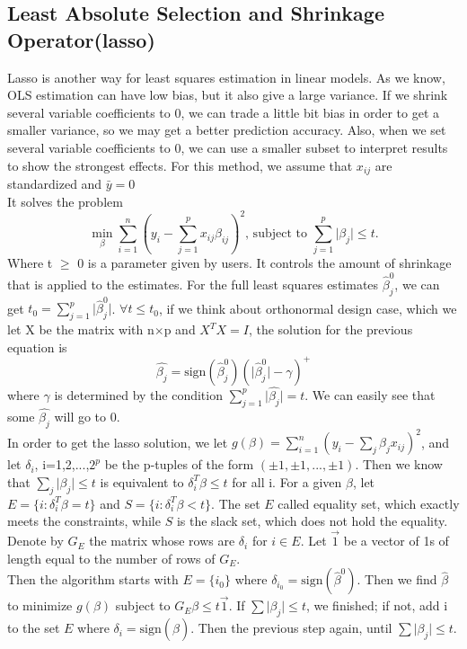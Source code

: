 \documentclass[12pt]{article}
\begin{document}
\subsection{Least Absolute Selection and Shrinkage Operator(lasso)}  
Lasso is another way for least squares estimation in linear models. As we know, OLS estimation can have low bias, but it also give a large variance. If we shrink several variable coefficients to 0, we can trade a little bit bias in order to get a smaller variance, so we may get a better prediction accuracy. Also, when we set several variable coefficients to 0, we can use a smaller subset to interpret results to show the strongest effects. For this method, we assume that $x_{ij}$ are standardized and $\bar y = 0$ \\
It solves the problem $$\min_{\beta} \sum_{i=1}^{n} (y_i-\sum_{j=1}^{p} x_{ij}\beta_{ij})^2 \text{, subject to } \sum_{j=1}^{p} \lvert \beta_j \rvert \leq t.$$
Where t $\geq$ 0 is a parameter given by users. It controls the amount of shrinkage that is applied to the estimates. For the full least squares estimates $\hat{\beta}^0_j$, we can get $t_0=\sum_{j=1}^{p} \lvert \hat{\beta}^0_j \rvert$. $\forall t \leq t_0$, if we think about orthonormal design case, which we let X be the matrix with n$\times$p and $X^TX = I$, the solution for the previous equation is $$\hat{\beta_j}=\text{sign}(\hat{\beta}^0_j)(\lvert \hat{\beta}^0_j \rvert - \gamma)^+$$ where $\gamma$ is determined by the condition $\sum_{j=1}^{p} \lvert \hat{\beta_j} \rvert = t$. We can easily see that some $\hat{\beta_j}$ will go to 0. \\
In order to get the lasso solution, we let $g(\beta)=\sum_{i=1}^{n} (y_i - \sum_{j} \beta_jx_{ij})^2$, and let $\delta_i$, i=1,2,...,$2^p$ be the p-tuples of the form $(\pm1,\pm1,...,\pm1)$. Then we know that $\sum_j \lvert \beta_j \rvert \leq t$ is equivalent to $\delta_i^T \beta \leq t$ for all i. For a given $\beta$, let $E=\{i:\delta_i^T \beta = t\}$ and $S=\{i:\delta_i^T \beta < t\}$. The set $E$ called equality set, which exactly meets the constraints, while $S$ is the slack set, which does not hold the equality. Denote by $G_E$ the matrix whose rows are $\delta_i$ for $i \in E$. Let $\vec{1}$ be a vector of 1s of length equal to the number of rows of $G_E$. \\
Then the algorithm starts with $E=\{i_0\}$ where $\delta_{i_0}=\text{sign}(\hat \beta^0)$. Then we find $\hat \beta$ to minimize $g(\beta)$ subject to $G_E \beta \leq t \vec{1}$. If $\sum \lvert \beta_j \rvert \leq t$, we finished; if not, add i to the set $E$ where $\delta_i=\text{sign}(\hat \beta)$. Then the previous step again, until $\sum \lvert \beta_j \rvert \leq t$.
 \cite{tibshirani1996regression}  
\end{document}
